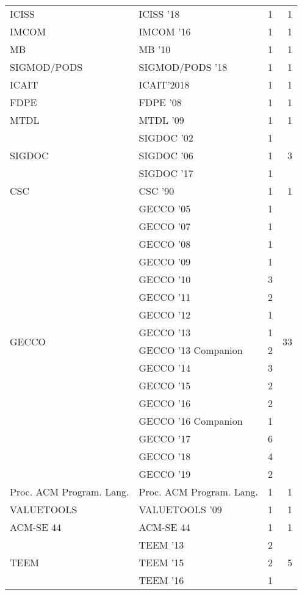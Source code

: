\begin{table*}[t]
\begin{tabular}{llrr}
\multirow{1}{*}{ICISS } & ICISS '18 & 1 & \multirow{1}{*}{1}\\
\multirow{1}{*}{IMCOM } & IMCOM '16 & 1 & \multirow{1}{*}{1}\\
\multirow{1}{*}{MB } & MB '10 & 1 & \multirow{1}{*}{1}\\
\multirow{1}{*}{SIGMOD/PODS } & SIGMOD/PODS '18 & 1 & \multirow{1}{*}{1}\\
\multirow{1}{*}{ICAIT} & ICAIT'2018 & 1 & \multirow{1}{*}{1}\\
\multirow{1}{*}{FDPE } & FDPE '08 & 1 & \multirow{1}{*}{1}\\
\multirow{1}{*}{MTDL } & MTDL '09 & 1 & \multirow{1}{*}{1}\\
\multirow{3}{*}{SIGDOC } & SIGDOC '02 & 1 & \multirow{3}{*}{3}\\
& SIGDOC '06 & 1 &\\
& SIGDOC '17 & 1 &\\
\multirow{1}{*}{CSC } & CSC '90 & 1 & \multirow{1}{*}{1}\\
\multirow{16}{*}{GECCO } & GECCO '05 & 1 & \multirow{16}{*}{33}\\
& GECCO '07 & 1 &\\
& GECCO '08 & 1 &\\
& GECCO '09 & 1 &\\
& GECCO '10 & 3 &\\
& GECCO '11 & 2 &\\
& GECCO '12 & 1 &\\
& GECCO '13 & 1 &\\
& GECCO '13 Companion & 2 &\\
& GECCO '14 & 3 &\\
& GECCO '15 & 2 &\\
& GECCO '16 & 2 &\\
& GECCO '16 Companion & 1 &\\
& GECCO '17 & 6 &\\
& GECCO '18 & 4 &\\
& GECCO '19 & 2 &\\
\multirow{1}{*}{Proc. ACM Program. Lang.} & Proc. ACM Program. Lang. & 1 & \multirow{1}{*}{1}\\
\multirow{1}{*}{VALUETOOLS } & VALUETOOLS '09 & 1 & \multirow{1}{*}{1}\\
\multirow{1}{*}{ACM-SE 44} & ACM-SE 44 & 1 & \multirow{1}{*}{1}\\
\multirow{3}{*}{TEEM } & TEEM '13 & 2 & \multirow{3}{*}{5}\\
& TEEM '15 & 2 &\\
& TEEM '16 & 1 &\\

\end{tabular}
\end{table*}
